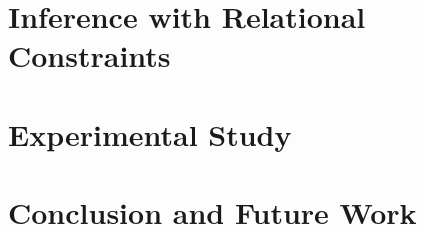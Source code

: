 \documentclass{www2010-submission}
\begin{document}
\section{Inference with Relational Constraints}
\label{sec:constraints}


\section{Experimental Study}
\label{sec:experiments}


\section{Conclusion and Future Work}
\label{sec:conclusion}





%


{\scriptsize

}

%

\end{document}

